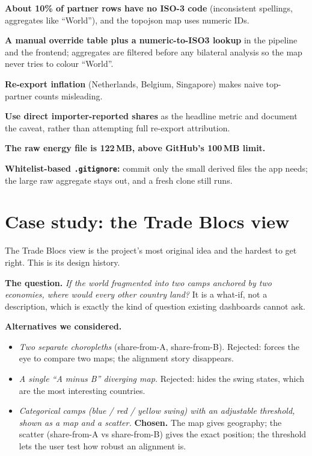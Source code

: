 \documentclass[a4paper,10pt]{article}
\begin{document}
\begin{challenge}
\textbf{About 10\% of partner rows have no ISO-3 code} (inconsistent spellings,
aggregates like ``World''), and the topojson map uses numeric IDs.
\end{challenge}
\begin{decision}
\textbf{A manual override table plus a numeric-to-ISO3 lookup} in the pipeline and
the frontend; aggregates are filtered before any bilateral analysis so the map
never tries to colour ``World''.
\end{decision}

\begin{challenge}
\textbf{Re-export inflation} (Netherlands, Belgium, Singapore) makes naive
top-partner counts misleading.
\end{challenge}
\begin{decision}
\textbf{Use direct importer-reported shares} as the headline metric and document
the caveat, rather than attempting full re-export attribution.
\end{decision}

\begin{challenge}
\textbf{The raw energy file is 122\,MB, above GitHub's 100\,MB limit.}
\end{challenge}
\begin{decision}
\textbf{Whitelist-based \texttt{.gitignore}:} commit only the small derived files
the app needs; the large raw aggregate stays out, and a fresh clone still runs.
\end{decision}

\newpage

\section{Case study: the Trade Blocs view}

The Trade Blocs view is the project's most original idea and the hardest to get
right. This is its design history.

\textbf{The question.} \emph{If the world fragmented into two camps anchored by
two economies, where would every other country land?} It is a what-if, not a
description, which is exactly the kind of question existing dashboards cannot ask.

\textbf{Alternatives we considered.}
\begin{itemize}
  \item \emph{Two separate choropleths} (share-from-A, share-from-B). Rejected:
  forces the eye to compare two maps; the alignment story disappears.
  \item \emph{A single ``A minus B'' diverging map.} Rejected: hides the swing
  states, which are the most interesting countries.
  \item \emph{Categorical camps (blue / red / yellow swing) with an adjustable
  threshold, shown as a map \emph{and} a scatter.} \textbf{Chosen.} The map gives
  geography; the scatter (share-from-A vs share-from-B) gives the exact position;
  the threshold lets the user test how robust an alignment is.
\end{itemize}
\end{document}
